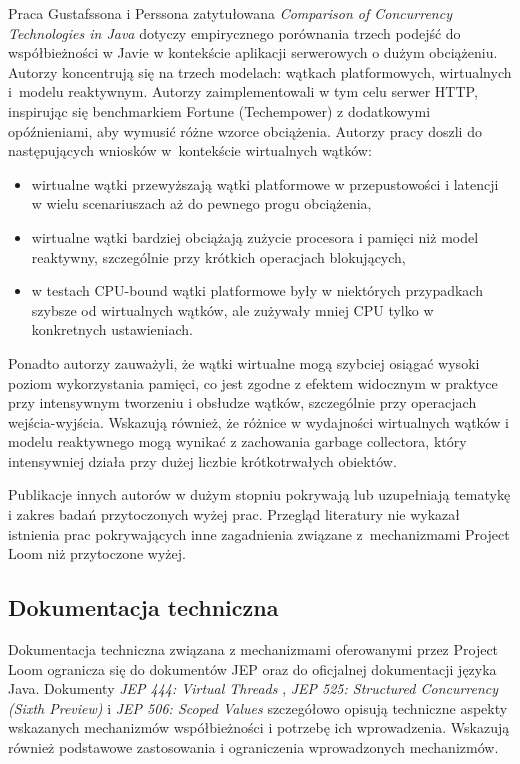 Praca Gustafssona i Perssona zatytułowana \textit{Comparison of Concurrency Technologies in Java} \cite{gustafsson2024} dotyczy empirycznego porównania trzech podejść do współbieżności w Javie w kontekście aplikacji serwerowych o dużym obciążeniu. Autorzy koncentrują się na trzech modelach: wątkach platformowych, wirtualnych i~modelu reaktywnym. Autorzy zaimplementowali w tym celu serwer HTTP, inspirując się benchmarkiem Fortune (Techempower) z dodatkowymi opóźnieniami, aby wymusić różne wzorce obciążenia. Autorzy pracy doszli do następujących wniosków w~kontekście wirtualnych wątków:
\begin{itemize}
    \itemsep0em
    \item wirtualne wątki przewyższają wątki platformowe w przepustowości i latencji w wielu scenariuszach aż do pewnego progu obciążenia,
    \item wirtualne wątki bardziej obciążają zużycie procesora i pamięci niż model reaktywny, szczególnie przy krótkich operacjach blokujących,
    \item w testach CPU-bound wątki platformowe były w niektórych przypadkach szybsze od wirtualnych wątków, ale zużywały mniej CPU tylko w konkretnych ustawieniach.
\end{itemize}
Ponadto autorzy zauważyli, że wątki wirtualne mogą szybciej osiągać wysoki poziom wykorzystania pamięci, co jest zgodne z efektem widocznym w praktyce przy intensywnym tworzeniu i obsłudze wątków, szczególnie przy operacjach wejścia-wyjścia. Wskazują również, że różnice w wydajności wirtualnych wątków i modelu reaktywnego mogą wynikać z zachowania garbage collectora, który intensywniej działa przy dużej liczbie krótkotrwałych obiektów.

Publikacje innych autorów \cite{veen2024,iwanowski2022,dossari2024,shahoor2024,georges2007} w dużym stopniu pokrywają lub uzupełniają tematykę i zakres badań przytoczonych wyżej prac. Przegląd literatury nie wykazał istnienia prac pokrywających inne zagadnienia związane z~mechanizmami Project Loom niż przytoczone wyżej.

\subsection{Dokumentacja techniczna}
Dokumentacja techniczna związana z mechanizmami oferowanymi przez Project Loom ogranicza się do dokumentów JEP oraz do oficjalnej dokumentacji języka Java. Dokumenty \textit{JEP 444: Virtual Threads} \cite{jep444}, \textit{JEP 525: Structured Concurrency (Sixth Preview)} \cite{jep525} i \textit{JEP 506: Scoped Values} \cite{jep506} szczegółowo opisują techniczne aspekty wskazanych mechanizmów współbieżności i potrzebę ich wprowadzenia. Wskazują również podstawowe zastosowania i ograniczenia wprowadzonych mechanizmów.

